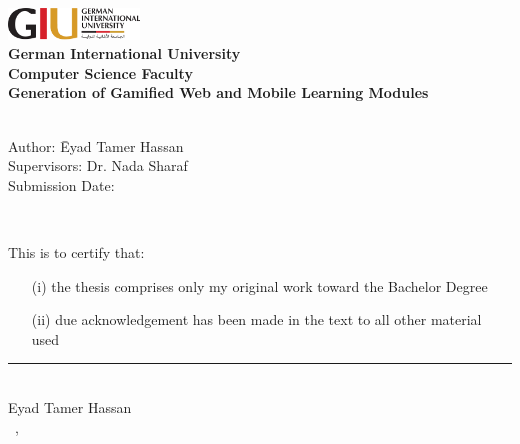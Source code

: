 \newcommand{\titlePage}{

\thispagestyle{empty}
\begin{center}
	\includegraphics[width=3.5cm]{figures/image.png}\\[2mm]
	\textbf{German International University}\\[2mm]
		\textbf{Computer Science Faculty}\\[1mm]

	
	\vspace{2cm}
	\doublespacing
	{\Huge \textbf{Generation of Gamified Web and Mobile Learning Modules}}\\
	\singlespacing
	\vspace{2cm}
	{\large \textbf{\typeOfThesis}}\\
	
	\vfill
	\parbox{1cm}{
  		\begin{large}
    			\begin{tabbing}
       			Author: \hspace{2cm}  
        			\= Eyad Tamer Hassan \\[2mm]
      			Supervisors: 
        			\> Dr. Nada Sharaf\\[2mm]
      			Submission Date: 
        			\>\submissionDate\\
    			\end{tabbing}
  		\end{large}
	}\\
\end{center}
\clearpage
}
\titlePage 
\thispagestyle{empty}
This is to certify that:
\begin{itemize}
\item[(i)] the thesis comprises only my original work toward the Bachelor Degree
\item[(ii)] due acknowledgement has been made in the text to all other material used
\end{itemize}

\vspace{2cm}
\begin{flushright}
\rule[0mm]{6cm}{0.2mm}\\
Eyad Tamer Hassan\\ 
\submissionDay~\submissionMonth,~\submissionYear\\
\end{flushright}
\clearpage
